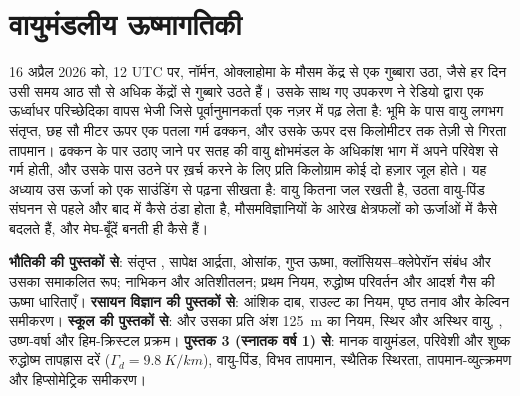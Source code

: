 \chapter{वायुमंडलीय ऊष्मागतिकी}\label{ch:b2:atmospheric-thermodynamics}

16 अप्रैल 2026 को, 12 UTC पर, नॉर्मन, ओक्लाहोमा के मौसम केंद्र से एक गुब्बारा उठा, जैसे
हर दिन उसी समय आठ सौ से अधिक केंद्रों से गुब्बारे उठते हैं। उसके साथ गए उपकरण ने
रेडियो द्वारा एक ऊर्ध्वाधर परिच्छेदिका वापस भेजी जिसे पूर्वानुमानकर्ता एक नज़र में पढ़ लेता है: भूमि के पास वायु
लगभग संतृप्त, छह सौ मीटर ऊपर एक पतला गर्म ढक्कन, और उसके ऊपर दस किलोमीटर तक
तेज़ी से गिरता तापमान। ढक्कन के पार उठाए जाने पर सतह की वायु क्षोभमंडल के अधिकांश भाग में
अपने परिवेश से गर्म होती, और उसके पास उठने पर ख़र्च करने के लिए प्रति किलोग्राम कोई दो हज़ार जूल
होते। यह अध्याय उस ऊर्जा को एक साउंडिंग से पढ़ना सीखता है: वायु कितना
जल रखती है, उठता वायु-पिंड संघनन से पहले और बाद में कैसे ठंडा होता है, मौसमविज्ञानियों के आरेख
क्षेत्रफलों को ऊर्जाओं में कैसे बदलते हैं, और मेघ-बूँदें बनती ही कैसे हैं।

\begin{recall}
\textbf{भौतिकी की पुस्तकों से}: संतृप्त , सापेक्ष आर्द्रता, ओसांक,
गुप्त ऊष्मा, क्लॉसियस--क्लेपेरॉन संबंध और उसका समाकलित रूप; नाभिकन और
अतिशीतलन; प्रथम नियम, रुद्धोष्म परिवर्तन और आदर्श गैस की ऊष्मा धारिताएँ।
\textbf{रसायन विज्ञान की पुस्तकों से}: आंशिक दाब, राउल्ट का नियम, पृष्ठ तनाव और केल्विन
समीकरण। \textbf{स्कूल की पुस्तकों से}:  और उसका प्रति अंश
\qty{125}{m} का नियम, स्थिर और अस्थिर वायु, , उष्ण-वर्षा और
हिम-क्रिस्टल प्रक्रम। \textbf{पुस्तक 3 (स्नातक वर्ष 1) से}: मानक वायुमंडल, परिवेशी
और शुष्क रुद्धोष्म तापह्रास दरें ($\Gamma_d = \qty{9.8}{K/km}$), वायु-पिंड, विभव
तापमान, स्थैतिक स्थिरता, तापमान-व्युत्क्रमण और हिप्सोमेट्रिक समीकरण।
\end{recall}


